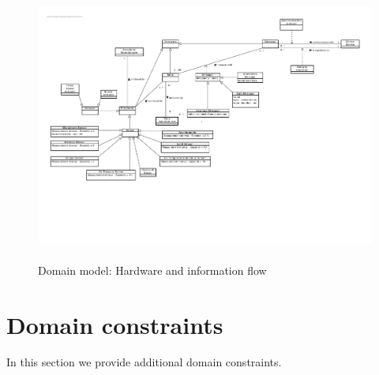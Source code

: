 \begin{figure}[H]
    \centering
    \includegraphics[width=\textwidth, height=9cm, angle=90]{Hardware_and_information_flow.pdf}
    \caption{Domain model: Hardware and information flow}\label{fig:domain_model2}
\end{figure}

\section{Domain constraints}
In this section we provide additional domain constraints.

